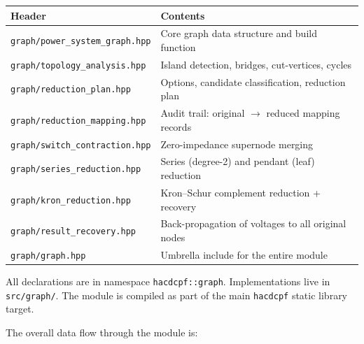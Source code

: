 \begin{center}
\begin{tabular}{ll}
\hline\hline
\textbf{Header} & \textbf{Contents} \\
\hline
\texttt{graph/power\_system\_graph.hpp} & Core graph data structure and build function \\
\texttt{graph/topology\_analysis.hpp}  & Island detection, bridges, cut-vertices, cycles \\
\texttt{graph/reduction\_plan.hpp}     & Options, candidate classification, reduction plan \\
\texttt{graph/reduction\_mapping.hpp}  & Audit trail: original $\to$ reduced mapping records \\
\texttt{graph/switch\_contraction.hpp} & Zero-impedance supernode merging \\
\texttt{graph/series\_reduction.hpp}   & Series (degree-2) and pendant (leaf) reduction \\
\texttt{graph/kron\_reduction.hpp}     & Kron--Schur complement reduction + recovery \\
\texttt{graph/result\_recovery.hpp}    & Back-propagation of voltages to all original nodes \\
\texttt{graph/graph.hpp}               & Umbrella include for the entire module \\
\hline\hline
\end{tabular}
\end{center}

All declarations are in namespace \texttt{hacdcpf::graph}.  Implementations
live in \texttt{src/graph/}.  The module is compiled as part of the main
\texttt{hacdcpf} static library target.

The overall data flow through the module is:

